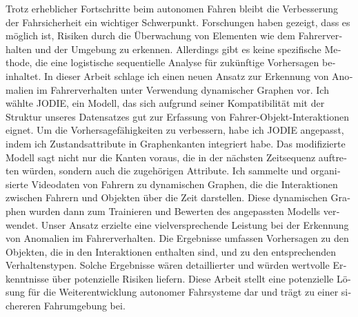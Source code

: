 \begin{otherlanguage}{ngerman} %
    Trotz erheblicher Fortschritte beim autonomen Fahren bleibt die Verbesserung der Fahrsicherheit ein wichtiger Schwerpunkt. Forschungen haben gezeigt, dass es möglich ist, Risiken durch die Überwachung von Elementen wie dem Fahrerverhalten und der Umgebung zu erkennen. Allerdings gibt es keine spezifische Methode, die eine logistische sequentielle Analyse für zukünftige Vorhersagen beinhaltet. In dieser Arbeit schlage ich einen neuen Ansatz zur Erkennung von Anomalien im Fahrerverhalten unter Verwendung dynamischer Graphen vor. Ich wählte JODIE, ein Modell, das sich aufgrund seiner Kompatibilität mit der Struktur unseres Datensatzes gut zur Erfassung von Fahrer-Objekt-Interaktionen eignet. Um die Vorhersagefähigkeiten zu verbessern, habe ich JODIE angepasst, indem ich Zustandsattribute in Graphenkanten integriert habe. Das modifizierte Modell sagt nicht nur die Kanten voraus, die in der nächsten Zeitsequenz auftreten würden, sondern auch die zugehörigen Attribute. Ich sammelte und organisierte Videodaten von Fahrern zu dynamischen Graphen, die die Interaktionen zwischen Fahrern und Objekten über die Zeit darstellen. Diese dynamischen Graphen wurden dann zum Trainieren und Bewerten des angepassten Modells verwendet. Unser Ansatz erzielte eine vielversprechende Leistung bei der Erkennung von Anomalien im Fahrerverhalten. Die Ergebnisse umfassen Vorhersagen zu den Objekten, die in den Interaktionen enthalten sind, und zu den entsprechenden Verhaltenstypen. Solche Ergebnisse wären detaillierter und würden wertvolle Erkenntnisse über potenzielle Risiken liefern. Diese Arbeit stellt eine potenzielle Lösung für die Weiterentwicklung autonomer Fahrsysteme dar und trägt zu einer sichereren Fahrumgebung bei.

\end{otherlanguage}


\makeatletter
{}
{\renewcommand{\abstractname}{Abstract}}
{\renewcommand{\abstractname}{Kurzfassung}}
\makeatother